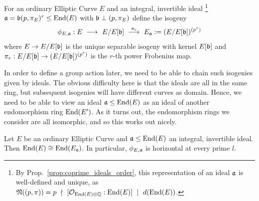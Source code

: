 \begin{definition}
    For an ordinary Elliptic Curve $E$ and an integral, invertible ideal
    \footnote{By Prop.~\ref{prop:coprime_ideals_order}, this representation of an ideal $\mathfrak{a}$ is well-defined and unique, as $\mathfrak{N}((p, \pi)) = p \ \nmid \  [\mathcal{O}_{\mathrm{End}(E) \otimes \mathbb{Q}} : \mathrm{End}(E)] \ \mid \  d(\mathrm{End}(E))$.}
    $\mathfrak{a} = \mathfrak{b}(p, \pi_E)^r \leq \mathrm{End}(E)$ with $\mathfrak{b} \perp (p, \pi_E)$ define the isogeny
    \begin{equation*}
        \phi_{E, \mathfrak{a}}: E \ \longrightarrow \ E/E[\mathfrak{b}] \ \overset{\pi_r}{\longrightarrow} \ E_{\mathfrak{a}} := (E/E[\mathfrak{b}])^{(p^r)}
    \end{equation*}
    where $E \to E/E[\mathfrak{b}]$ is the unique separable isogeny with kernel $E[\mathfrak{b}]$ and $\pi_r: E/E[\mathfrak{b}] \to (E/E[\mathfrak{b}])^{(p^r)}$ is the $r$-th power Frobenius map.
\end{definition}
In order to define a group action later, we need to be able to chain such isogenies given by ideals.
The obvious difficulty here is that the ideals are all in the same ring, but subsequent isogenies will have different curves as domain.
Hence, we need to be able to view an ideal $\mathfrak{a} \leq \mathrm{End}(E)$ as an ideal of another endomorphism ring $\mathrm{End}(E')$.
As it turns out, the endomorphism rings we consider are all isomorphic, and so this works out nicely. 
\begin{lemma}
    Let $E$ be an ordinary Elliptic Curve and $\mathfrak{a} \leq \mathrm{End}(E)$ an integral, invertible ideal.
    Then $\mathrm{End}(E) \cong \mathrm{End}(E_{\mathfrak{a}})$.
    In particular, $\phi_{E, \mathfrak{a}}$ is horizontal at every prime $l$.
\end{lemma}
